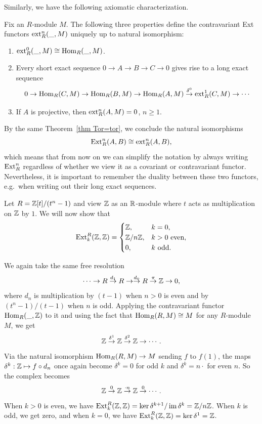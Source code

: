 Similarly, we have the following axiomatic characterization.

\begin{thm}
    Fix an $R$-module $M$. The following three properties define the contravariant Ext functors $\operatorname{ext}_R^n(\_,M)$ uniquely up to natural isomorphism:
    \begin{enumerate}
        \item $\operatorname{ext}^0_R(\_,M)\cong\operatorname{Hom}_R(\_,M)$.
        \item Every short exact sequence $0\to A\to B\to C\to 0$ gives rise to a long exact sequence
        \[0\to \operatorname{Hom}_R(C,M)\to \operatorname{Hom}_R(B,M)\to \operatorname{Hom}_R(A,M)\overset{\delta^0}{\to} \operatorname{ext}^1_R(C,M)\to\cdots \]
        \item If $A$ is projective, then $\operatorname{ext}_R^n(A,M)=0$, $n\geq 1$.
    \end{enumerate}
\end{thm}

By the same Theorem~\ref{thm Tor=tor}, we conclude the natural isomorphisms
\[\operatorname{Ext}^n_R(A,B)\cong \operatorname{ext}^n_R(A,B),\]
which means that from now on we can simplify the notation by always writing $\operatorname{Ext}_R^n$ regardless of whether we view it as a covariant or contravariant functor. Nevertheless, it is important to remember the duality between these two functors, e.g.~when writing out their long exact sequences.


\begin{example}[Continuation of Example~\ref{example Tor with R=Z[t]/(tn-1)}]
    Let $R=\mathbb{Z}[t]\slash(t^n-1)$ and view $\mathbb{Z}$ as an $\mathbb{R}$-module where $t$ acts as multiplication on $\mathbb{Z}$ by $1$. We will now show that
        \[\operatorname{Ext}_k^R(\mathbb{Z},\mathbb{Z})=\begin{cases}
            \mathbb{Z},&k=0,\\
            \mathbb{Z}\slash n\mathbb{Z},&k>0\text{ even},\\
            0,& k\text{ odd}.
        \end{cases}\]

    We again take the same free resolution
    \[\cdots\to R\overset{d_1}{\to}R\to \overset{d_0}{\to}R \overset{\pi}{\to}\mathbb{Z}\to 0,\]
    where $d_n$ is multiplication by $(t-1)$ when $n>0$ is even and by $(t^n-1)/(t-1)$ when $n$ is odd. Applying the contravariant functor $\operatorname{Hom}_R(\_,\mathbb{Z})$ to it and using the fact that $\operatorname{Hom}_R(R,M)\cong M$ for any $R$-module $M$, we get
    \[\mathbb{Z}\overset{\delta^1}{\to}\mathbb{Z} \overset{\delta^2}{\to}\mathbb{Z}\to\cdots .\]
    Via the natural isomorphism $\operatorname{Hom}_R(R,M)\to M$ sending $f$ to $f(1)$, the maps $\delta^k:\mathbb{Z}\mapsto f\circ d_n$ once again become $\delta^k=0$ for odd $k$ and $\delta^k=n\cdot$ for even $n$. So the complex becomes
    \[\mathbb{Z}\overset{0}{\to}\mathbb{Z}\overset{\cdot n}{\to}\mathbb{Z}\overset{0}{\to}\cdots.\]
    When $k>0$ is even, we have $\operatorname{Ext}_k^R(\mathbb{Z},\mathbb{Z})=\ker \delta^{k+1}\slash \operatorname{im}\delta^k=\mathbb{Z}\slash n\mathbb{Z}$. When $k$ is odd, we get zero, and when $k=0$, we have $\operatorname{Ext}^R_k(\mathbb{Z},\mathbb{Z})=\ker \delta^1=\mathbb{Z}$. 
\end{example}


